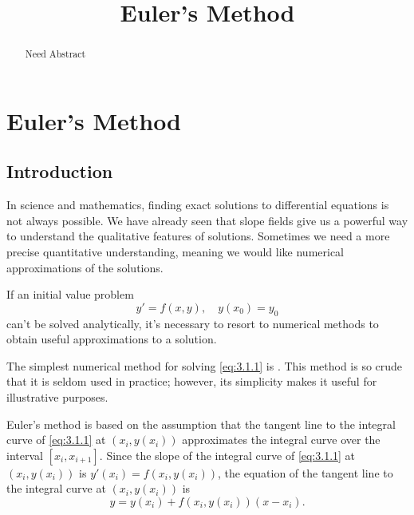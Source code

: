 \documentclass{ximera}
\title{Euler's Method}
\begin{document}
 
\begin{abstract}
Need Abstract
\end{abstract}
 
\maketitle
 
\section*{Euler's Method}
 
\subsection*{Introduction}
In science and mathematics, finding exact solutions to differential
equations is not always possible.  We have already seen that slope
fields give us a powerful way to understand the qualitative features
of solutions.  Sometimes we need a more precise quantitative
understanding, meaning we would like numerical approximations of the
solutions.
 
If an initial value problem
\begin{equation} \label{eq:3.1.1}
y'=f(x,y),\quad y(x_0)=y_0
 \end{equation}
can't be solved analytically,
 it's necessary to resort to
numerical methods to obtain useful  approximations to a solution.
 
The simplest numerical method for solving \eqref{eq:3.1.1} is
\href{http://www-history.mcs.st-and.ac.uk/Mathematicians/Euler.html}
.
This method is so crude that it
is seldom used in practice;     however, its simplicity makes it useful
for illustrative purposes.
 
Euler's method is based on the assumption that the tangent line to the
integral curve of \eqref{eq:3.1.1} at $(x_i,y(x_i))$ approximates the
integral curve over the interval $[x_i,x_{i+1}]$.
 Since the slope of the integral curve of
\eqref{eq:3.1.1} at $(x_i,y(x_i))$ is $y'(x_i)=f(x_i,y(x_i))$, the
equation of the tangent line to the integral curve at $(x_i,y(x_i))$
is
\begin{equation} \label{eq:3.1.2}
y=y(x_i)+f(x_i,y(x_i))(x-x_i).
\end{equation}
 
\end{document}
